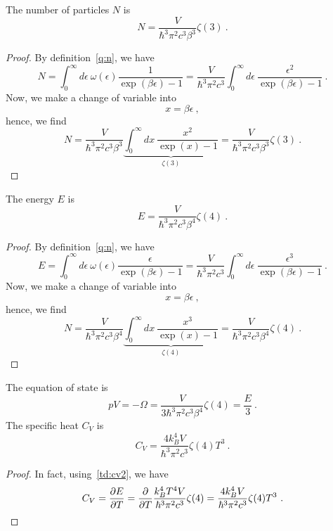     The number of particles $N$ is 
    \begin{equation*}
        N = \frac{V}{\hbar^3 \pi^2 c^3 \beta^3} \zeta(3) ~.
    \end{equation*}
    \begin{proof}
        By definition~\eqref{q:n}, we have 
        \begin{equation}
            N = \int_0^\infty d\epsilon ~ \omega(\epsilon) \frac{1}{\exp(\beta \epsilon) - 1} = \frac{V}{\hbar^3 \pi^2 c^3} \int_0^\infty d\epsilon ~ \frac{\epsilon^2}{\exp(\beta \epsilon) - 1} ~.
        \end{equation}
        Now, we make a change of variable into 
        \begin{equation}
            x = \beta \epsilon ~,
        \end{equation}
        hence, we find 
        \begin{equation*}
            N = \frac{V}{\hbar^3 \pi^2 c^3 \beta^3} \underbrace{\int_0^\infty dx ~ \frac{x^2}{\exp(x) - 1}}_{\zeta(3)} = \frac{V}{\hbar^3 \pi^2 c^3 \beta^3} \zeta(3) ~.
        \end{equation*}
    \end{proof}
    The energy $E$ is 
    \begin{equation*}
        E = \frac{V}{\hbar^3 \pi^2 c^3 \beta^4} \zeta(4) ~.
    \end{equation*}
    \begin{proof}
        By definition~\eqref{q:n}, we have 
        \begin{equation}
            E = \int_0^\infty d\epsilon ~ \omega(\epsilon) \frac{\epsilon}{\exp(\beta \epsilon) - 1} = \frac{V}{\hbar^3 \pi^2 c^3} \int_0^\infty d\epsilon ~ \frac{\epsilon^3}{\exp(\beta \epsilon) - 1} ~.
        \end{equation}
        Now, we make a change of variable into 
        \begin{equation}
            x = \beta \epsilon ~,
        \end{equation}
        hence, we find 
        \begin{equation*}
            N = \frac{V}{\hbar^3 \pi^2 c^3 \beta^4} \underbrace{\int_0^\infty dx ~ \frac{x^3}{\exp(x) - 1}}_{\zeta(4)} = \frac{V}{\hbar^3 \pi^2 c^3 \beta^4} \zeta(4) ~.
        \end{equation*}
    \end{proof}
    The equation of state is 
    \begin{equation}
        pV = - \Omega = \frac{V}{3 \hbar^3 \pi^2 c^3 \beta^4} \zeta(4) = \frac{E}{3} ~.
    \end{equation}
    The specific heat $C_V$ is 
    \begin{equation}
        C_V = \frac{4 k_B^4 V}{\hbar^3 \pi^2 c^3} \zeta(4) T^3 ~.
    \end{equation}
    \begin{proof}
        In fact, using~\eqref{td:cv2}, we have 
        \begin{equation}
            C_V = \frac{\partial E}{\partial T} = \frac{\partial}{\partial T} \frac{k_B^4 T^4 V}{\hbar^3 \pi^2 c^3} \zeta(4) = \frac{4 k_B^4 V}{\hbar^3 \pi^2 c^3} \zeta(4) T^3 ~.
        \end{equation}
    \end{proof}

